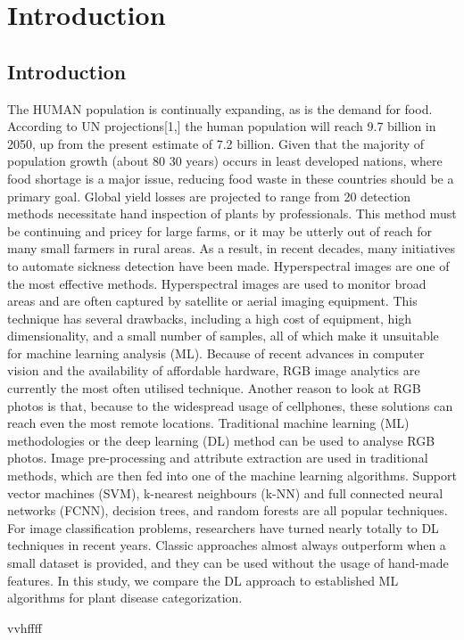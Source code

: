 
\chapter{Introduction}
\label{ch:INTR}
\section{Introduction}
The HUMAN population is continually expanding, as is the demand for food. According to
UN projections[1,] the human population will reach 9.7 billion in 2050, up from the present
estimate of 7.2 billion. Given that the majority of population growth (about 80%
30 years) occurs in least developed nations, where food shortage is a major issue, reducing
food waste in these countries should be a primary goal. Global yield losses are projected to
range from 20%
detection methods necessitate hand inspection of plants by professionals. This method must
be continuing and pricey for large farms, or it may be utterly out of reach for many small
farmers in rural areas. As a result, in recent decades, many initiatives to automate sickness
detection have been made. Hyperspectral images are one of the most effective methods.
Hyperspectral images are used to monitor broad areas and are often captured by satellite or
aerial imaging equipment. This technique has several drawbacks, including a high cost of
equipment, high dimensionality, and a small number of samples, all of which make it
unsuitable for machine learning analysis (ML). Because of recent advances in computer
vision and the availability of affordable hardware, RGB image analytics are currently the
most often utilised technique. Another reason to look at RGB photos is that, because to the
widespread usage of cellphones, these solutions can reach even the most remote locations.
Traditional machine learning (ML) methodologies or the deep learning (DL) method can be
used to analyse RGB photos. Image pre-processing and attribute extraction are used in
traditional methods, which are then fed into one of the machine learning algorithms. Support
vector machines (SVM), k-nearest neighbours (k-NN) and full connected neural networks
(FCNN), decision trees, and random forests are all popular techniques. For image
classification problems, researchers have turned nearly totally to DL techniques in recent
years. Classic approaches almost always outperform when a small dataset is provided, and
they can be used without the usage of hand-made features. In this study, we compare the DL
approach to established ML algorithms for plant disease categorization.
\begin{definition}
vvhffff
\end{definition}


